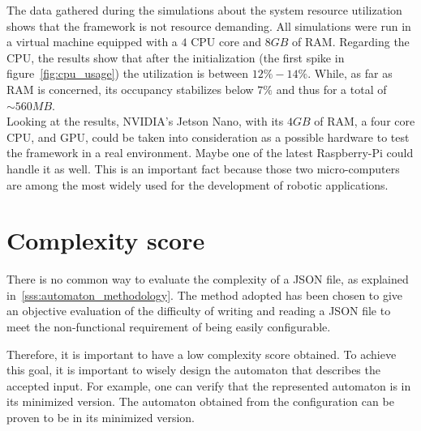 \documentclass[../thesis.tex]{subfiles}
\begin{document}
The data gathered during the simulations about the system resource utilization shows that the framework is not resource demanding. All simulations were run in a virtual machine equipped with a $4$ CPU core and $8GB$ of RAM. Regarding the CPU, the results show that after the initialization (the first spike in figure~\ref{fig:cpu_usage}) the utilization is between $12\% -14\%$. While, as far as RAM is concerned, its occupancy stabilizes below $7\%$ and thus for a total of $\sim 560MB$.\\

Looking at the results, NVIDIA's Jetson Nano, with its $4GB$ of RAM, a four core CPU, and GPU, could be taken into consideration as a possible hardware to test the framework in a real environment. Maybe one of the latest Raspberry-Pi could handle it as well. This is an important fact because those two micro-computers are among the most widely used for the development of robotic applications.
 
\section{Complexity score}
There is no common way to evaluate the complexity of a JSON file, as explained in~\ref{sss:automaton_methodology}. The method adopted has been chosen to give an objective evaluation of the difficulty of writing and reading a JSON file to meet the non-functional requirement of being easily configurable.

Therefore, it is important to have a low complexity score obtained. To achieve this goal, it is important to wisely design the automaton that describes the accepted input. For example, one can verify that the represented automaton is in its minimized version. The automaton obtained from the configuration can be proven to be in its minimized version.
\end{document}
